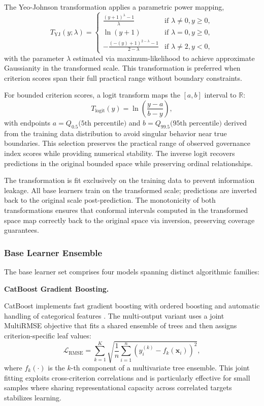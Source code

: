 \documentclass[12pt,a4paper]{article}
\begin{document}
The Yeo-Johnson transformation applies a parametric power mapping,
\begin{equation}
T_{\text{YJ}}(y; \lambda) = \begin{cases}
\frac{(y+1)^\lambda - 1}{\lambda} & \text{if } \lambda \neq 0, y \ge 0, \\
\ln(y+1) & \text{if } \lambda = 0, y \ge 0, \\
-\frac{(-(y)+1)^{2-\lambda} - 1}{2-\lambda} & \text{if } \lambda \neq 2, y < 0,
\end{cases}
\end{equation}
with the parameter $\lambda$ estimated via maximum-likelihood to achieve approximate Gaussianity in the transformed scale. This transformation is preferred when criterion scores span their full practical range without boundary constraints.

For bounded criterion scores, a logit transform maps the $[a, b]$ interval to $\mathbb{R}$:
\begin{equation}
T_{\text{logit}}(y) = \ln\left(\frac{y - a}{b - y}\right),
\end{equation}
with endpoints $a = Q_{0.5}\text{(5th percentile)}$ and $b = Q_{99.5}\text{(95th percentile)}$ derived from the training data distribution to avoid singular behavior near true boundaries. This selection preserves the practical range of observed governance index scores while providing numerical stability. The inverse logit recovers predictions in the original bounded space while preserving ordinal relationships.

The transformation is fit exclusively on the training data to prevent information leakage. All base learners train on the transformed scale; predictions are inverted back to the original scale post-prediction. The monotonicity of both transformations ensures that conformal intervals computed in the transformed space map correctly back to the original space via inversion, preserving coverage guarantees.

\subsubsection{Base Learner Ensemble}

The base learner set comprises four models spanning distinct algorithmic families:

\textbf{CatBoost Gradient Boosting.} 

CatBoost implements fast gradient boosting with ordered boosting and automatic handling of categorical features \citep{Prokhorenkova2018}. The multi-output variant uses a joint MultiRMSE objective that fits a shared ensemble of trees and then assigns criterion-specific leaf values:
\begin{equation}
\mathcal{L}_{\text{RMSE}} = \sum_{k=1}^{K} \sqrt{\frac{1}{n} \sum_{i=1}^{n} \left(y_{i}^{(k)} - f_k(\mathbf{x}_i)\right)^2},
\end{equation}
where $f_k(\cdot)$ is the $k$-th component of a multivariate tree ensemble. This joint fitting exploits cross-criterion correlations and is particularly effective for small samples where sharing representational capacity across correlated targets stabilizes learning.
\end{document}
